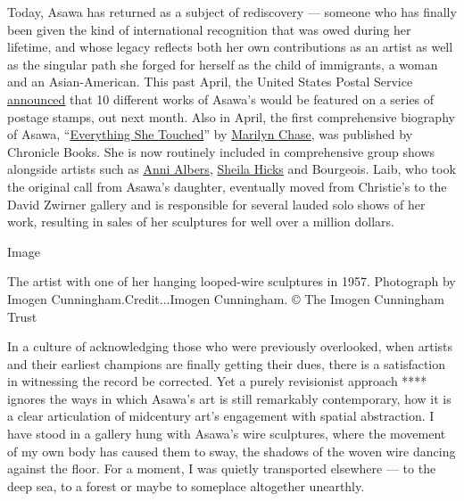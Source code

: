 Today, Asawa has returned as a subject of rediscovery --- someone who
has finally been given the kind of international recognition that was
owed during her lifetime, and whose legacy reflects both her own
contributions as an artist as well as the singular path she forged for
herself as the child of immigrants, a woman and an Asian-American. This
past April, the United States Postal Service
\href{https://ruthasawa.com/usps-announces-2020-ruth-asawa-stamp/}{announced}
that 10 different works of Asawa's would be featured on a series of
postage stamps, out next month. Also in April, the first comprehensive
biography of Asawa,
``\href{https://www.chroniclebooks.com/products/everything-she-touched}{Everything
She Touched}'' by \href{https://www.marilynchase.com/}{Marilyn Chase},
was published by Chronicle Books. She is now routinely included in
comprehensive group shows alongside artists such as
\href{https://www.nytimes3xbfgragh.onion/1994/05/10/obituaries/anni-albers-94-textile-artist-and-the-widow-of-josef-albers.html}{Anni
Albers},
\href{https://www.nytimes3xbfgragh.onion/2017/05/03/arts/design/sheila-hicks-work-on-the-high-line.html}{Sheila
Hicks} and Bourgeois. Laib, who took the original call from Asawa's
daughter, eventually moved from Christie's to the David Zwirner gallery
and is responsible for several lauded solo shows of her work, resulting
in sales of her sculptures for well over a million dollars.

Image

The artist with one of her hanging looped-wire sculptures in 1957.
Photograph by Imogen Cunningham.Credit...Imogen Cunningham. © The Imogen
Cunningham Trust

In a culture of acknowledging those who were previously overlooked, when
artists and their earliest champions are finally getting their dues,
there is a satisfaction in witnessing the record be corrected. Yet a
purely revisionist approach **** ignores the ways in which Asawa's art
is still remarkably contemporary, how it is a clear articulation of
midcentury art's engagement with spatial abstraction. I have stood in a
gallery hung with Asawa's wire sculptures, where the movement of my own
body has caused them to sway, the shadows of the woven wire dancing
against the floor. For a moment, I was quietly transported elsewhere ---
to the deep sea, to a forest or maybe to someplace altogether unearthly.

